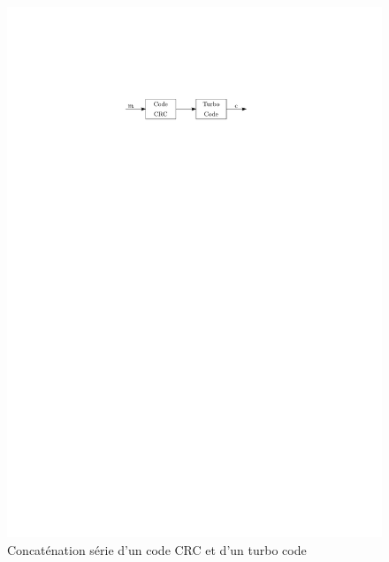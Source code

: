 \begin{figure}[b]
	\begin{center}
	\includegraphics[]{main/ch1_fig/abaiss/crc.pdf}
	\end{center}
	\caption{Concaténation série d'un code CRC et d'un turbo code \label{fig:crc}}
\end{figure}


